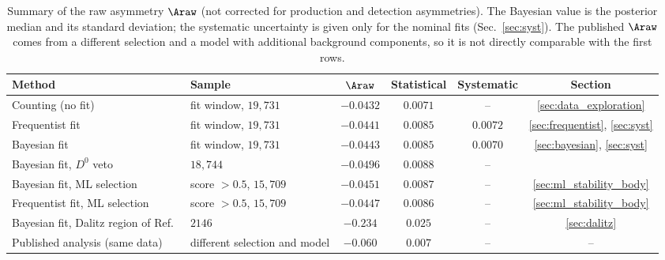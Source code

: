 \begin{table}[t]
\centering
\begin{tabular}{llcccc}
\toprule
Method & Sample & $\Araw$ & Statistical & Systematic & Section \\
\midrule
Counting (no fit) & fit window, $19{,}731$ & $-0.0432$ & $0.0071$ & -- & \ref{sec:data_exploration} \\
Frequentist fit & fit window, $19{,}731$ & $-0.0441$ & $0.0085$ & $0.0072$ & \ref{sec:frequentist}, \ref{sec:syst} \\
Bayesian fit & fit window, $19{,}731$ & $-0.0443$ & $0.0085$ & $0.0070$ & \ref{sec:bayesian}, \ref{sec:syst} \\
Bayesian fit, $D^0$ veto & $18{,}744$ & $-0.0496$ & $0.0088$ & -- &  \\
Bayesian fit, ML selection & score $>0.5$, $15{,}709$ & $-0.0451$ & $0.0087$ & -- & \ref{sec:ml_stability_body} \\
Frequentist fit, ML selection & score $>0.5$, $15{,}709$ & $-0.0447$ & $0.0086$ & -- & \ref{sec:ml_stability_body} \\
Bayesian fit, Dalitz region of Ref.~\cite{lhcb_cpv_2013} & $2146$ & $-0.234$ & $0.025$ & -- & \ref{sec:dalitz} \\
\midrule
Published analysis (same data)~\cite{lhcb_cpv_2013} & different selection and model & $-0.060$ & $0.007$ & -- & -- \\
\bottomrule
\end{tabular}
\caption{Summary of the raw asymmetry $\Araw$ (not corrected for production and detection asymmetries). The Bayesian value is the posterior median and its standard deviation; the systematic uncertainty is given only for the nominal fits (Sec.~\ref{sec:syst}). The published $\Araw$ comes from a different selection and a model with additional background components, so it is not directly comparable with the first rows.}
\label{tab:summary}
\end{table}

